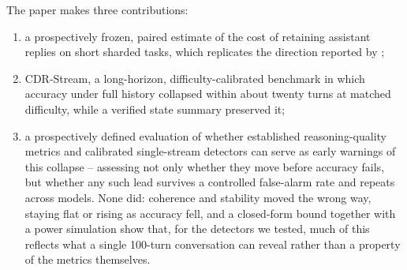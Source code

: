 The paper makes three contributions:
\begin{enumerate}
  \item a prospectively frozen, paired estimate of the cost of retaining
    assistant replies on short sharded tasks, which replicates the direction
    reported by \citet{huang2026benefit};
  \item CDR-Stream, a long-horizon, difficulty-calibrated benchmark in which
    accuracy under full history collapsed within about twenty turns at matched
    difficulty, while a verified state summary preserved it;
  \item a prospectively defined evaluation of whether established
    reasoning-quality metrics and calibrated single-stream detectors can
    serve as early warnings of this collapse -- assessing not only whether
    they move before accuracy fails, but whether any such lead survives a
    controlled false-alarm rate and repeats across models. None did: coherence
    and stability moved the wrong way, staying flat or rising as accuracy
    fell, and a closed-form bound together with a power simulation show that,
    for the detectors we tested, much of this reflects what a single 100-turn
    conversation can reveal rather than a property of the metrics themselves.
\end{enumerate}
